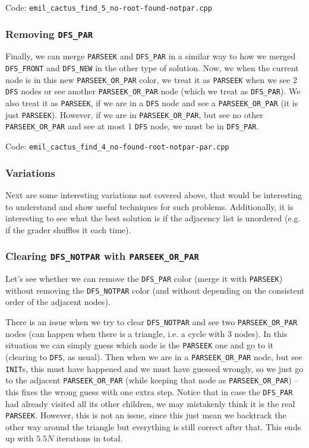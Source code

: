 \documentclass{article}
\begin{document}
Code: \verb|emil_cactus_find_5_no-root-found-notpar.cpp|

\subsubsection{Removing \texttt{DFS\_PAR}}

Finally, we can merge \verb|PARSEEK| and \verb|DFS_PAR| in a similar way to how we merged \verb|DFS_FRONT| and \verb|DFS_NEW| in the other type of solution. Now, we when the current node is in this new \verb|PARSEEK_OR_PAR| color, we treat it as \verb|PARSEEK| when we see 2 \verb|DFS| nodes or see another \verb|PARSEEK_OR_PAR| node (which we treat as \verb|DFS_PAR|). We also treat it as \verb|PARSEEK|, if we are in a \verb|DFS| node and see a \verb|PARSEEK_OR_PAR| (it is just \verb|PARSEEK|). However, if we are in \verb|PARSEEK_OR_PAR|, but see no other \verb|PARSEEK_OR_PAR| and see at most 1 \verb|DFS| node, we must be in \verb|DFS_PAR|.

Code: \verb|emil_cactus_find_4_no-found-root-notpar-par.cpp|

\subsubsection{Variations}

Next are some interesting variations not covered above, that would be interesting to understand and show useful techniques for such problems. Additionally, it is interesting to see what the best solution is if the adjacency list is unordered (e.g. if the grader shuffles it each time).

\subsubsection{Clearing \texttt{DFS\_NOTPAR} with \texttt{PARSEEK\_OR\_PAR}}

Let's see whether we can remove the \verb|DFS_PAR| color (merge it with \verb|PARSEEK|) without removing the \verb|DFS_NOTPAR| color (and without depending on the consistent order of the adjacent nodes).

There is an issue when we try to clear \verb|DFS_NOTPAR| and see two \verb|PARSEEK_OR_PAR| nodes (can happen when there is a triangle, i.e. a cycle with 3 nodes). In this situation we can simply guess which node is the \verb|PARSEEK| one and go to it (clearing to \verb|DFS|, as usual). Then when we are in a \verb|PARSEEK_OR_PAR| node, but see \verb|INIT|s, this must have happened and we must have guessed wrongly, so we just go to the adjacent \verb|PARSEEK_OR_PAR| (while keeping that node as \verb|PARSEEK_OR_PAR|) -- this fixes the wrong guess with one extra step. Notice that in case the \verb|DFS_PAR| had already visited all its other children, we may mistakenly think it is the real \verb|PARSEEK|. However, this is not an issue, since this just mean we backtrack the other way around the triangle but everything is still correct after that. This ends up with $5.5 N$ iterations in total.
\end{document}
